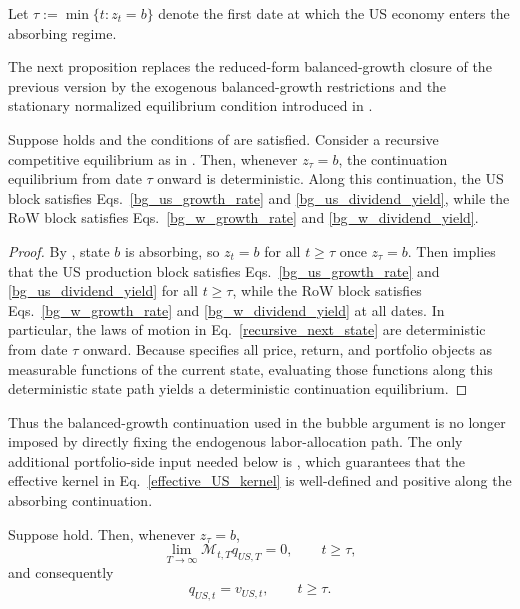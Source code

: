 \documentclass{article}
\begin{document}
Let $\tau:=\min\{t:z_t=b\}$ denote the first date at which the US economy enters the absorbing regime.

The next proposition replaces the reduced-form balanced-growth closure of the previous version by the exogenous balanced-growth restrictions and the stationary normalized equilibrium condition introduced in .

\begin{prop}\label{prop_absorbing_bg_primitives}\label{ass_balanced_growth}
Suppose  holds and the conditions of  are satisfied. Consider a recursive competitive equilibrium as in . Then, whenever $z_\tau=b$, the continuation equilibrium from date $\tau$ onward is deterministic. Along this continuation, the US block satisfies Eqs.~\eqref{bg_us_growth_rate} and \eqref{bg_us_dividend_yield}, while the RoW block satisfies Eqs.~\eqref{bg_w_growth_rate} and \eqref{bg_w_dividend_yield}.
\end{prop}

\begin{proof}
By , state $b$ is absorbing, so $z_t=b$ for all $t\ge \tau$ once $z_\tau=b$. Then  implies that the US production block satisfies Eqs.~\eqref{bg_us_growth_rate} and \eqref{bg_us_dividend_yield} for all $t\ge \tau$, while the RoW block satisfies Eqs.~\eqref{bg_w_growth_rate} and \eqref{bg_w_dividend_yield} at all dates. In particular, the laws of motion in Eq.~\eqref{recursive_next_state} are deterministic from date $\tau$ onward. Because  specifies all price, return, and portfolio objects as measurable functions of the current state, evaluating those functions along this deterministic state path yields a deterministic continuation equilibrium.
\end{proof}

Thus the balanced-growth continuation used in the bubble argument is no longer imposed by directly fixing the endogenous labor-allocation path. The only additional portfolio-side input needed below is , which guarantees that the effective kernel in Eq.~\eqref{effective_US_kernel} is well-defined and positive along the absorbing continuation.

\begin{prop}\label{prop_no_bubble_absorbing_branch}\label{prop1}
Suppose  hold. Then, whenever $z_\tau=b$,
\[
\lim_{T\to\infty}\mathcal M_{t,T}q_{US,T}=0,
\qquad
t\ge \tau,
\]
and consequently
\[
q_{US,t}=v_{US,t},
\qquad
t\ge \tau.
\]
\end{prop}
\end{document}
